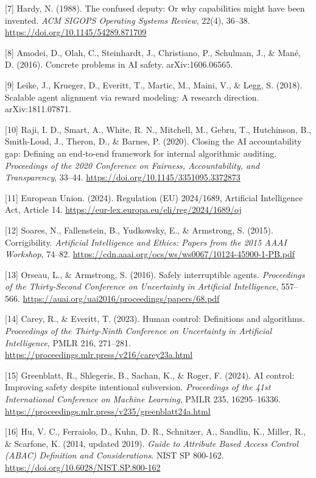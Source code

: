 {[}7{]} Hardy, N. (1988). The confused deputy: Or why capabilities might have been invented. \emph{ACM SIGOPS Operating Systems Review}, 22(4), 36--38. \url{https://doi.org/10.1145/54289.871709}

{[}8{]} Amodei, D., Olah, C., Steinhardt, J., Christiano, P., Schulman, J., \& Mané, D. (2016). Concrete problems in AI safety. arXiv:1606.06565.

{[}9{]} Leike, J., Krueger, D., Everitt, T., Martic, M., Maini, V., \& Legg, S. (2018). Scalable agent alignment via reward modeling: A research direction. arXiv:1811.07871.

{[}10{]} Raji, I. D., Smart, A., White, R. N., Mitchell, M., Gebru, T., Hutchinson, B., Smith-Loud, J., Theron, D., \& Barnes, P. (2020). Closing the AI accountability gap: Defining an end-to-end framework for internal algorithmic auditing. \emph{Proceedings of the 2020 Conference on Fairness, Accountability, and Transparency}, 33--44. \url{https://doi.org/10.1145/3351095.3372873}

{[}11{]} European Union. (2024). Regulation (EU) 2024/1689, Artificial Intelligence Act, Article 14. \url{https://eur-lex.europa.eu/eli/reg/2024/1689/oj}

{[}12{]} Soares, N., Fallenstein, B., Yudkowsky, E., \& Armstrong, S. (2015). Corrigibility. \emph{Artificial Intelligence and Ethics: Papers from the 2015 AAAI Workshop}, 74--82. \url{https://cdn.aaai.org/ocs/ws/ws0067/10124-45900-1-PB.pdf}

{[}13{]} Orseau, L., \& Armstrong, S. (2016). Safely interruptible agents. \emph{Proceedings of the Thirty-Second Conference on Uncertainty in Artificial Intelligence}, 557--566. \url{https://auai.org/uai2016/proceedings/papers/68.pdf}

{[}14{]} Carey, R., \& Everitt, T. (2023). Human control: Definitions and algorithms. \emph{Proceedings of the Thirty-Ninth Conference on Uncertainty in Artificial Intelligence}, PMLR 216, 271--281. \url{https://proceedings.mlr.press/v216/carey23a.html}

{[}15{]} Greenblatt, R., Shlegeris, B., Sachan, K., \& Roger, F. (2024). AI control: Improving safety despite intentional subversion. \emph{Proceedings of the 41st International Conference on Machine Learning}, PMLR 235, 16295--16336. \url{https://proceedings.mlr.press/v235/greenblatt24a.html}

{[}16{]} Hu, V. C., Ferraiolo, D., Kuhn, D. R., Schnitzer, A., Sandlin, K., Miller, R., \& Scarfone, K. (2014, updated 2019). \emph{Guide to Attribute Based Access Control (ABAC) Definition and Considerations}. NIST SP 800-162. \url{https://doi.org/10.6028/NIST.SP.800-162}

